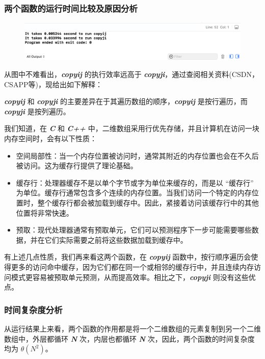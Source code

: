             \subsubsection*{两个函数的运行时间比较及原因分析}
                \begin{figure}[htbp]
                    \centering
                    \includegraphics*[width = 15cm]{work2_s2.png}
                \end{figure}
                \par 从图中不难看出，\textbf{\textit{copyij}} 的执行效率远高于 \textbf{\textit{copyji}}，通过查阅相关资料(CSDN，CSAPP等)，现给出如下解释：
                \par \textbf{\textit{copyij}} 和 \textbf{\textit{copyji}} 的主要差异在于其遍历数组的顺序，\textbf{\textit{copyij}} 是按行遍历，而 \textbf{\textit{copyji}} 是按列遍历。
                \par 我们知道，在 \textbf{\textit{C}} 和 \textbf{\textit{C++}} 中，二维数组采用行优先存储，并且计算机在访问一块内存空间时，会有以下性质：
                \begin{itemize}
                    \item 空间局部性：当一个内存位置被访问时，通常其附近的内存位置也会在不久后被访问。这为缓存行提供了理论基础。
                    \item 缓存行：处理器缓存不是以单个字节或字为单位来缓存的，而是以 ``缓存行'' 为单位。缓存行通常包含多个连续的内存位置。当我们访问一个特定的内存位置时，整个缓存行都会被加载到缓存中。因此，紧接着访问该缓存行中的其他位置将非常快速。
                    \item 预取：现代处理器通常有预取单元，它们可以预测程序下一步可能需要哪些数据，并在它们实际需要之前将这些数据加载到缓存中。
                \end{itemize}
                \par 有上述几点性质，我们再来看这两个函数，在 \textbf{\textit{copyij}} 函数中，按行顺序遍历会使得更多的访问命中缓存，因为它们都在同一个或相邻的缓存行中，并且连续内存访问模式更容易被预取单元预测，从而提高效率。相比之下，\textbf{\textit{copyji}} 则没有这些优点。
            \subsubsection*{时间复杂度分析}
                \par 从运行结果上来看，两个函数的作用都是将一个二维数组的元素复制到另一个二维数组中，外层都循环 \textbf{\textit{N}} 次，内层也都循环 \textbf{\textit{N}} 次，因此，两个函数的时间复杂度均为 $\theta(N^2)$。
